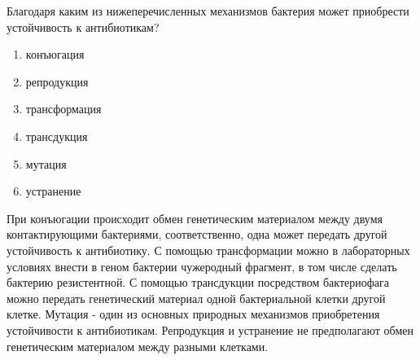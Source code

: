 
Благодаря каким из нижеперечисленных механизмов бактерия может приобрести
устойчивость к антибиотикам?

\begin{enumerate}
    \item конъюгация
    \item репродукция
    \item трансформация
    \item трансдукция
    \item мутация
    \item устранение
\end{enumerate}

\explanationSection

При конъюгации происходит обмен генетическим материалом между двумя контактирующими бактериями, соответственно, одна может передать другой устойчивость к антибиотику. С помощью трансформации можно в лабораторных условиях внести в геном бактерии  чужеродный фрагмент, в том числе сделать бактерию резистентной. С помощью трансдукции посредством бактериофага можно передать генетический материал одной бактериальной клетки другой клетке. Мутация - один из основных природных механизмов приобретения устойчивости к антибиотикам. Репродукция и устранение не предполагают обмен генетическим материалом между разными клетками.

